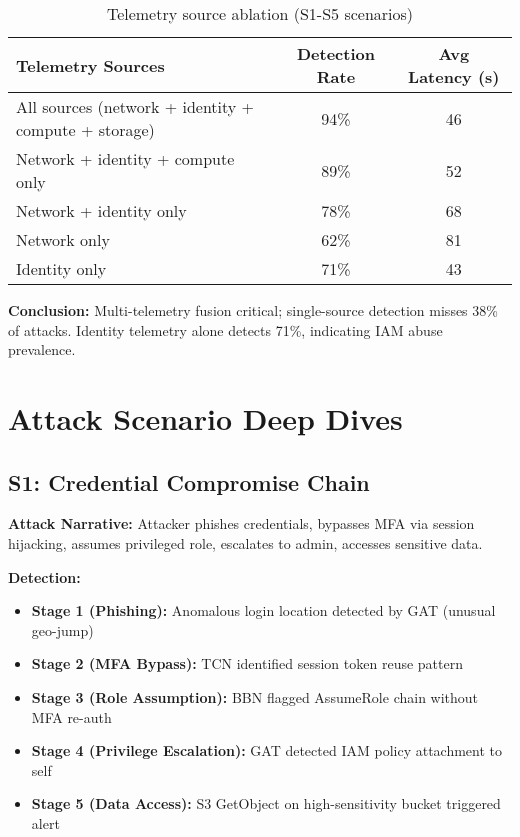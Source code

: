 \begin{table}[H]
\centering
\caption{Telemetry source ablation (S1-S5 scenarios)}
\label{tab:telemetry-ablation}
\begin{tabular}{lcc}
\toprule
\textbf{Telemetry Sources} & \textbf{Detection Rate} & \textbf{Avg Latency (s)} \\
\midrule
All sources (network + identity + compute + storage) & 94\% & 46 \\
Network + identity + compute only & 89\% & 52 \\
Network + identity only & 78\% & 68 \\
Network only & 62\% & 81 \\
Identity only & 71\% & 43 \\
\bottomrule
\end{tabular}
\end{table}

\textbf{Conclusion:} Multi-telemetry fusion critical; single-source detection misses 38\% of attacks. Identity telemetry alone detects 71\%, indicating IAM abuse prevalence.

\section{Attack Scenario Deep Dives}\label{sec:eval-scenarios}
\subsection{S1: Credential Compromise Chain}
\textbf{Attack Narrative:} Attacker phishes credentials, bypasses MFA via session hijacking, assumes privileged role, escalates to admin, accesses sensitive data.

\textbf{Detection:}
\begin{itemize}
    \item \textbf{Stage 1 (Phishing):} Anomalous login location detected by GAT (unusual geo-jump)
    \item \textbf{Stage 2 (MFA Bypass):} TCN identified session token reuse pattern
    \item \textbf{Stage 3 (Role Assumption):} BBN flagged AssumeRole chain without MFA re-auth
    \item \textbf{Stage 4 (Privilege Escalation):} GAT detected IAM policy attachment to self
    \item \textbf{Stage 5 (Data Access):} S3 GetObject on high-sensitivity bucket triggered alert
\end{itemize}

